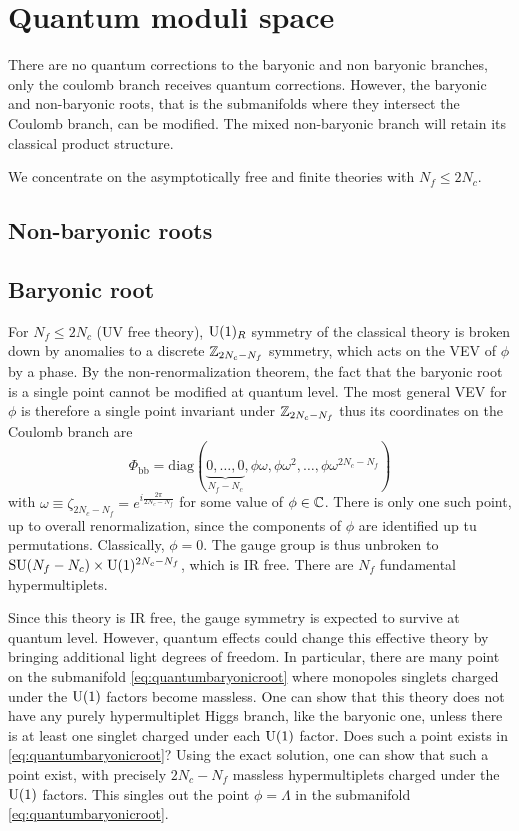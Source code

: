 \section{Quantum moduli space}\label{secquantummodulispaceSU}

    There are no quantum corrections to the baryonic and non baryonic branches, only the coulomb branch receives quantum corrections. However, the baryonic and non-baryonic roots, that is the submanifolds where they intersect the Coulomb branch, can be modified. The mixed non-baryonic branch will retain its classical product structure.

    We concentrate on the asymptotically free and finite theories with $N_f\leq2N_c$.

    \subsection{Non-baryonic roots}

        
        

    \subsection{Baryonic root}

        For $N_f\leq 2N_c$ (UV free theory), $\text{U}(1)_R$ symmetry of the classical theory is broken down by anomalies to a discrete $\mathbb{Z}_{2N_c-N_f}$ symmetry, which acts on the VEV of $\phi$ by a phase. By the non-renormalization theorem, the fact that the baryonic root is a single point cannot be modified at quantum level. The most general VEV for $\phi$ is therefore a single point invariant under $\mathbb{Z}_{2N_c-N_f}$ thus its coordinates on the Coulomb branch are
        \begin{equation}
            \Phi_{\text{bb}}=\text{diag}(\underbrace{0,\dots,0}_{N_f-N_c},\phi\omega,\phi\omega^2,\dots,\phi\omega^{2N_c-N_f})\label{eq:quantumbaryonicroot}
        \end{equation}
        with $\omega\equiv\zeta_{2N_c-N_f}=e^{i\frac{2\pi}{2N_c-N_f}}$ for some value of $\phi\in\mathbb{C}$. There is only one such point, up to overall renormalization, since the components of $\phi$ are identified up tu permutations. Classically, $\phi=0$. The gauge group is thus unbroken to $\text{SU}(N_f-N_c)\times\text{U}(1)^{2N_c-N_f}$, which is IR free. There are $N_f$ fundamental hypermultiplets. 
        
        Since this theory is IR free, the gauge symmetry is expected to survive at quantum level. However, quantum effects could change this effective theory by bringing additional light degrees of freedom. In particular, there are many point on the submanifold \eqref{eq:quantumbaryonicroot} where monopoles singlets charged under the $\text{U}(1)$ factors become massless. One can show that this theory does not have any purely hypermultiplet Higgs branch, like the baryonic one, unless there is at least one singlet charged under each $\text{U}(1)$ factor. Does such a point exists in \eqref{eq:quantumbaryonicroot}? Using the exact solution, one can show that such a point exist, with precisely $2N_c-N_f$ massless hypermultiplets charged under the $\text{U}(1)$ factors. This singles out the point $\phi=\Lambda$ in the submanifold \eqref{eq:quantumbaryonicroot}.

